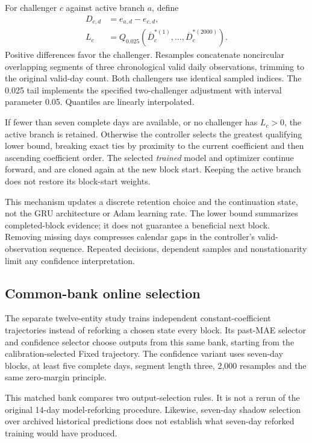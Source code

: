 \documentclass[pdflatex,iicol,sn-mathphys-num]{sn-jnl}
\begin{document}
For challenger $c$ against active branch $a$, define
\begin{equation}\begin{aligned}
D_{c,d}&=e_{a,d}-e_{c,d},\\
L_c&=Q_{0.025}\!\left(\overline{D}_{c}^{*(1)},\ldots,
\overline{D}_{c}^{*(2000)}\right).
\end{aligned}\label{eq:lcb}\end{equation}
Positive differences favor the challenger. Resamples concatenate noncircular overlapping segments of three chronological valid daily observations, trimming to the original valid-day count. Both challengers use identical sampled indices. The 0.025 tail implements the specified two-challenger adjustment with interval parameter 0.05. Quantiles are linearly interpolated.

If fewer than seven complete days are available, or no challenger has $L_c>0$, the active branch is retained. Otherwise the controller selects the greatest qualifying lower bound, breaking exact ties by proximity to the current coefficient and then ascending coefficient order. The selected \emph{trained} model and optimizer continue forward, and are cloned again at the new block start. Keeping the active branch does not restore its block-start weights.

This mechanism updates a discrete retention choice and the continuation state, not the GRU architecture or Adam learning rate. The lower bound summarizes completed-block evidence; it does not guarantee a beneficial next block. Removing missing days compresses calendar gaps in the controller's valid-observation sequence. Repeated decisions, dependent samples and nonstationarity limit any confidence interpretation.

\subsection{Common-bank online selection}
The separate twelve-entity study trains independent constant-coefficient trajectories instead of reforking a chosen state every block. Its past-MAE selector and confidence selector choose outputs from this same bank, starting from the calibration-selected Fixed trajectory. The confidence variant uses seven-day blocks, at least five complete days, segment length three, 2,000 resamples and the same zero-margin principle.

This matched bank compares two output-selection rules. It is not a rerun of the original 14-day model-reforking procedure. Likewise, seven-day shadow selection over archived historical predictions does not establish what seven-day reforked training would have produced.
\end{document}
